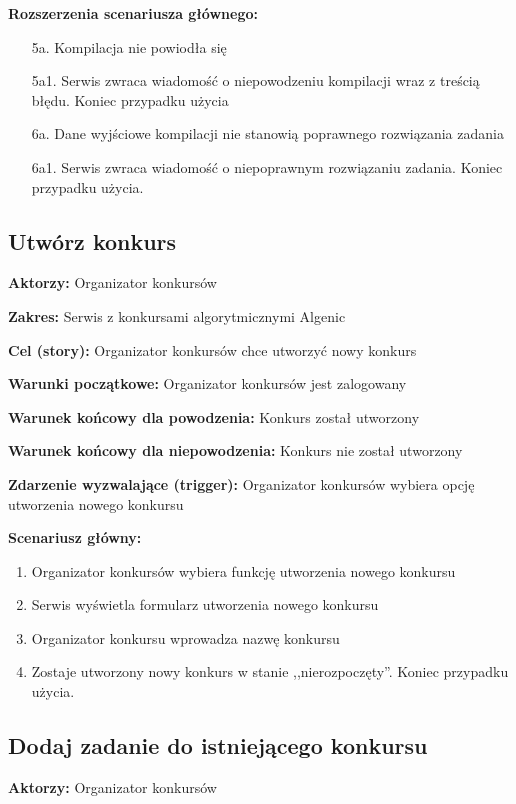\documentclass{article}
\begin{document}
\textbf{Rozszerzenia scenariusza głównego:}
\begin{itemize}
	\item[5a.] Kompilacja nie powiodła się
	\item[5a1.] Serwis zwraca wiadomość o niepowodzeniu kompilacji wraz z treścią błędu. Koniec przypadku użycia
	\item[6a.] Dane wyjściowe kompilacji nie stanowią poprawnego rozwiązania zadania
	\item[6a1.] Serwis zwraca wiadomość o niepoprawnym rozwiązaniu zadania. Koniec przypadku użycia.
\end{itemize}

\newpage
\subsection{Utwórz konkurs}

\textbf{Aktorzy:} Organizator konkursów

\textbf{Zakres:} Serwis z konkursami algorytmicznymi Algenic

\textbf{Cel (story):} Organizator konkursów chce utworzyć nowy konkurs

\textbf{Warunki początkowe:} Organizator konkursów jest zalogowany

\textbf{Warunek końcowy dla powodzenia:} Konkurs został utworzony

\textbf{Warunek końcowy dla niepowodzenia:} Konkurs nie został utworzony

\textbf{Zdarzenie wyzwalające (trigger):} Organizator konkursów wybiera opcję utworzenia nowego konkursu

\textbf{Scenariusz główny:}
\begin{enumerate}
	\item Organizator konkursów wybiera funkcję utworzenia nowego konkursu
	\item Serwis wyświetla formularz utworzenia nowego konkursu
	\item Organizator konkursu wprowadza nazwę konkursu
	\item Zostaje utworzony nowy konkurs w stanie ,,nierozpoczęty''. Koniec przypadku użycia.
\end{enumerate}


\newpage
\subsection{Dodaj zadanie do istniejącego konkursu}

\textbf{Aktorzy:} Organizator konkursów  
\end{document}
